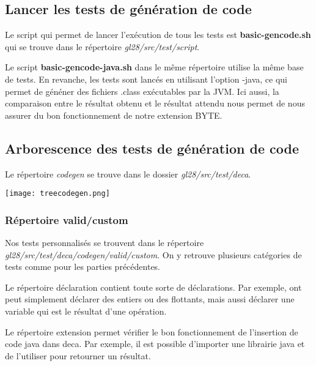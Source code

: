 \documentclass[12pt, a4paper, one side]{article}
\begin{document}
\subsection{Lancer les tests de génération de code}
Le script qui permet de lancer l'exécution de tous les tests est \textbf{basic-gencode.sh} qui se trouve dans le répertoire \textit{gl28/src/test/script}.

\begin{flushleft}
Le script \textbf{basic-gencode-java.sh} dans le même répertoire utilise la même base de tests. En revanche, les tests sont lancés en utilisant l'option -java, ce qui permet de généner des fichiers .class exécutables par la JVM. Ici aussi, la comparaison entre le résultat obtenu et le résultat attendu nous permet de nous assurer du bon fonctionnement de notre extension BYTE.
\end{flushleft}

\subsection{Arborescence des tests de génération de code}
Le répertoire \textit{codegen} se trouve dans le dossier \textit{gl28/src/test/deca}.
\begin{center} 
    \texttt{[image: treecodegen.png]} 
\end{center}
\subsubsection{Répertoire valid/custom}
Nos tests personnalisés se trouvent dans le répertoire \newline
\textit{gl28/src/test/deca/codegen/valid/custom}. On y retrouve plusieurs catégories de tests comme pour les parties précédentes.

\begin{flushleft}
Le répertoire déclaration contient toute sorte de déclarations. Par exemple, ont peut simplement déclarer des entiers ou des flottants, mais aussi déclarer une variable qui est le résultat d'une opération.
\end{flushleft}

\begin{flushleft}
Le répertoire extension permet vérifier le bon fonctionnement de l'insertion de code java dans deca. Par exemple, il est possible d'importer une librairie java et de l'utiliser pour retourner un résultat.
\end{flushleft}
\end{document}
